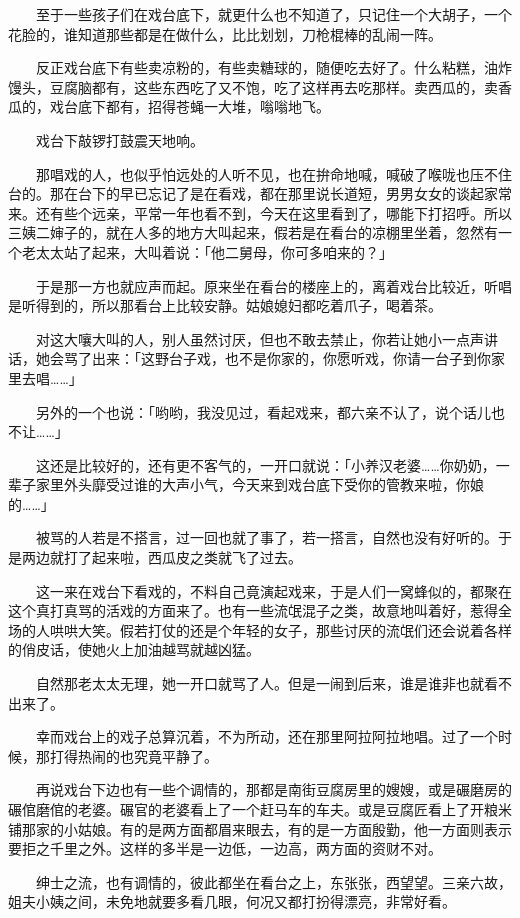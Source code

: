 \documentclass[UTF8]{ctexart}
\begin{document}
　　至于一些孩子们在戏台底下，就更什么也不知道了，只记住一个大胡子，一个花脸的，谁知道那些都是在做什么，比比划划，刀枪棍棒的乱闹一阵。

　　反正戏台底下有些卖凉粉的，有些卖糖球的，随便吃去好了。什么粘糕，油炸馒头，豆腐脑都有，这些东西吃了又不饱，吃了这样再去吃那样。卖西瓜的，卖香瓜的，戏台底下都有，招得苍蝇一大堆，嗡嗡地飞。

　　戏台下敲锣打鼓震天地响。

　　那唱戏的人，也似乎怕远处的人听不见，也在拚命地喊，喊破了喉咙也压不住台的。那在台下的早已忘记了是在看戏，都在那里说长道短，男男女女的谈起家常来。还有些个远亲，平常一年也看不到，今天在这里看到了，哪能下打招呼。所以三姨二婶子的，就在人多的地方大叫起来，假若是在看台的凉棚里坐着，忽然有一个老太太站了起来，大叫着说：「他二舅母，你可多咱来的？」

　　于是那一方也就应声而起。原来坐在看台的楼座上的，离着戏台比较近，听唱是听得到的，所以那看台上比较安静。姑娘媳妇都吃着爪子，喝着茶。

　　对这大嚷大叫的人，别人虽然讨厌，但也不敢去禁止，你若让她小一点声讲话，她会骂了出来：「这野台子戏，也不是你家的，你愿听戏，你请一台子到你家里去唱……」

　　另外的一个也说：「哟哟，我没见过，看起戏来，都六亲不认了，说个话儿也不让……」

　　这还是比较好的，还有更不客气的，一开口就说：「小养汉老婆……你奶奶，一辈子家里外头靡受过谁的大声小气，今天来到戏台底下受你的管教来啦，你娘的……」

　　被骂的人若是不搭言，过一回也就了事了，若一搭言，自然也没有好听的。于是两边就打了起来啦，西瓜皮之类就飞了过去。

　　这一来在戏台下看戏的，不料自己竟演起戏来，于是人们一窝蜂似的，都聚在这个真打真骂的活戏的方面来了。也有一些流氓混子之类，故意地叫着好，惹得全场的人哄哄大笑。假若打仗的还是个年轻的女子，那些讨厌的流氓们还会说着各样的俏皮话，使她火上加油越骂就越凶猛。

　　自然那老太太无理，她一开口就骂了人。但是一闹到后来，谁是谁非也就看不出来了。

　　幸而戏台上的戏子总算沉着，不为所动，还在那里阿拉阿拉地唱。过了一个时候，那打得热闹的也究竟平静了。

　　再说戏台下边也有一些个调情的，那都是南街豆腐房里的嫂嫂，或是碾磨房的碾倌磨倌的老婆。碾官的老婆看上了一个赶马车的车夫。或是豆腐匠看上了开粮米铺那家的小姑娘。有的是两方面都眉来眼去，有的是一方面殷勤，他一方面则表示要拒之千里之外。这样的多半是一边低，一边高，两方面的资财不对。

　　绅士之流，也有调情的，彼此都坐在看台之上，东张张，西望望。三亲六故，姐夫小姨之间，未免地就要多看几眼，何况又都打扮得漂亮，非常好看。
\end{document}
